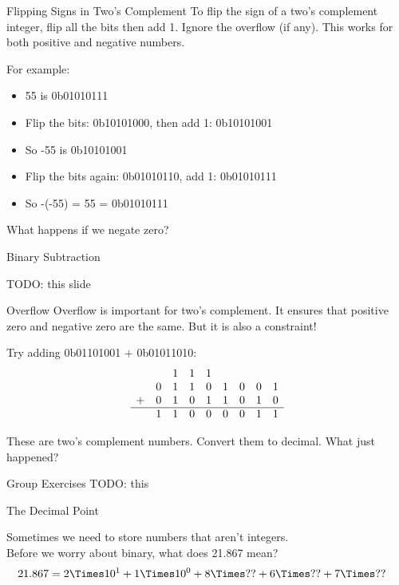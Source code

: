 \begin{frame}{Flipping Signs in Two's Complement}
	To flip the sign of a two's complement integer, flip all the bits then add 1. Ignore the overflow (if any). This works for both positive and negative numbers.

	For example:
	\begin{itemize}
		\item 55 is 0b01010111
		\item Flip the bits: 0b10101000, then add 1: 0b10101001
		\item So -55 is 0b10101001
		\item Flip the bits again: 0b01010110, add 1: 0b01010111
		\item So -(-55) = 55 = 0b01010111
	\end{itemize}

	What happens if we negate zero?
\end{frame}


\begin{frame}{Binary Subtraction}

	TODO: this slide

\end{frame}


\begin{frame}{Overflow}
	Overflow is important for two's complement. It ensures that positive zero and negative zero are the same. But it is also a constraint!

	Try adding 0b01101001 + 0b01011010:
	\[
		\begin{array}{ccccccccc}
			  &   & 1 & 1 & 1 &   &   &   &   \\
			  & 0 & 1 & 1 & 0 & 1 & 0 & 0 & 1 \\
			+ & 0 & 1 & 0 & 1 & 1 & 0 & 1 & 0 \\
			\hline
			  & 1 & 1 & 0 & 0 & 0 & 0 & 1 & 1 \\
		\end{array}
	\]

	These are two's complement numbers. Convert them to decimal. What just
	happened?

\end{frame}

\begin{frame}{Group Exercises}
TODO: this
\end{frame}



\begin{frame}{The Decimal Point}

	Sometimes we need to store numbers that aren't integers. \\

	Before we worry about binary, what does 21.867 mean? \\

	\begin{align*}
		21.867 & = 2 \Times 10^1 + 1 \Times 10^0 + 8 \Times ?? + 6 \Times ?? + 7 \Times ??
	\end{align*}

\end{frame}

